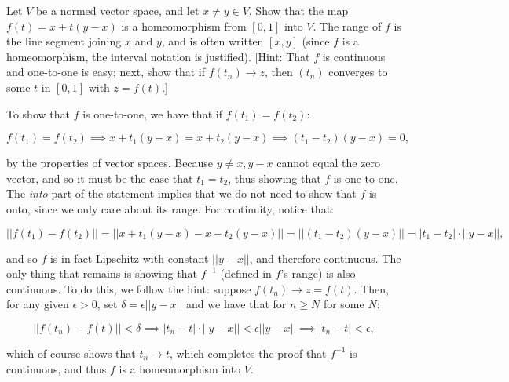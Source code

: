 \begin{exercise}{27}
    Let $V$ be a normed vector space, and let $x \neq y \in V$.
    Show that the map $f(t) = x + t(y - x)$ is a homeomorphism from $[0, 1]$ into $V$.
    The range of $f$ is the line segment joining $x$ and $y$, and is often written $[x, y]$ (since $f$ is a homeomorphism, the interval notation is justified).
    [Hint: That $f$ is continuous and one-to-one is easy; next, show that if $f(t_n) \rightarrow z$, then $(t_n)$ converges to some $t$ in $[0, 1]$ with $z = f(t)$.]
\end{exercise}

\begin{solution}
    
    To show that $f$ is one-to-one, we have that if $f(t_1) = f(t_2)$:

    \[f(t_1) = f(t_2) \implies x + t_1(y - x) = x + t_2(y - x) \implies (t_1 - t_2)(y - x) = 0,\]

    by the properties of vector spaces.
    Because $y \neq x, y - x$ cannot equal the zero vector, and so it must be the case that $t_1 = t_2$, thus showing that $f$ is one-to-one.
    The \textit{into} part of the statement implies that we do not need to show that $f$ is onto, since we only care about its range.
    For continuity, notice that:

    \[\lvert \lvert f(t_1) - f(t_2) \rvert \rvert = \lvert \lvert x + t_1(y - x) - x - t_2(y - x) \rvert \rvert = \lvert \lvert (t_1 - t_2)(y - x) \rvert \rvert = \lvert t_1 - t_2 \rvert \cdot \lvert \lvert y - x \rvert \rvert,\]

    and so $f$ is in fact Lipschitz with constant $\lvert \lvert y - x \rvert \rvert$, and therefore continuous.
    The only thing that remains is showing that $f^{-1}$ (defined in $f$'s range) is also continuous.
    To do this, we follow the hint: suppose $f(t_n) \rightarrow z = f(t)$.
    Then, for any given $\epsilon > 0$, set $\delta = \epsilon \lvert \lvert y - x \rvert \rvert$ and we have that for $n \geq N$ for some $N$:

    \[\lvert \lvert f(t_n) - f(t) \rvert \rvert < \delta \implies \lvert t_n - t \rvert \cdot \lvert \lvert y - x \rvert \rvert < \epsilon \lvert \lvert y - x \rvert \rvert \implies \lvert t_n - t \rvert < \epsilon,\]

    which of course shows that $t_n \rightarrow t$, which completes the proof that $f^{-1}$ is continuous, and thus $f$ is a homeomorphism into $V$.
\end{solution}

